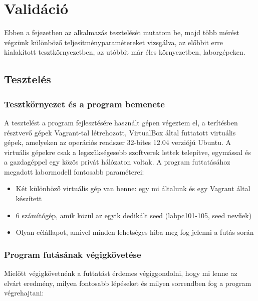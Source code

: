 \chapter{Validáció}
\label{chp:validation}

Ebben a fejezetben az alkalmazás tesztelését mutatom be, majd több mérést végzünk különböző teljesítményparamétereket vizsgálva, az előbbit erre kialakított tesztkörnyezetben, az utóbbit már éles környezetben, laborgépeken.

\section{Tesztelés}

%
\subsection{Tesztkörnyezet és a program bemenete}
%

A tesztelést a program fejlesztésére használt gépen végeztem el, a terítésben résztvevő gépek Vagrant-tal létrehozott, VirtualBox\cite{virtualbox} által futtatott virtuális gépek, amelyeken az operációs rendszer 32-bites 12.04 verziójú Ubuntu\cite{ubuntu}. A virtuális gépekre csak a legszükségesebb szoftverek lettek telepítve, egymással és a gazdagéppel egy közös privát hálózaton voltak. A program futtatásához megadott labormodell fontosabb paraméterei:

\begin{itemize}
  \item Két különböző virtuális gép van benne: egy mi általunk és egy Vagrant által készített
  \item 6 számítógép, amik közül az egyik dedikált seed (labpc101-105, seed nevűek)
  \item Olyan célállapot, amivel minden lehetséges hiba meg fog jelenni a futás során
\end{itemize}

%
\subsection{Program futásának végigkövetése}
%

Mielőtt végigkövetnénk a futtatást érdemes végiggondolni, hogy mi lenne az elvárt eredmény, milyen fontosabb lépéseket és milyen sorrendben fog a program végrehajtani:

